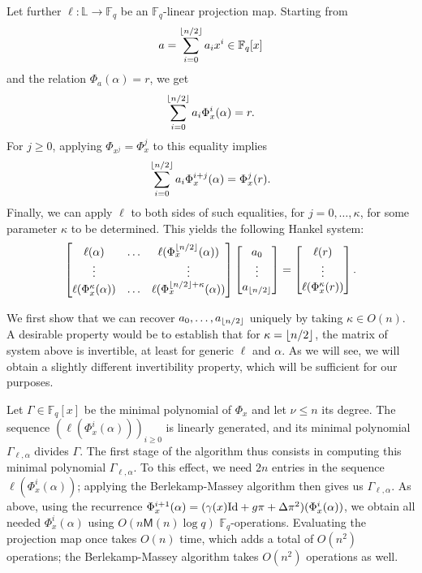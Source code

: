 \documentclass[sigconf]{acmart}
\newcommand{\M}{\mathsf{M}}
\newcommand{\F}{\mathbb{F}}
\renewcommand{\L}{\mathbb{L}}
\DeclarePairedDelimiter\floor{\lfloor}{\rfloor}
\begin{document}
Let further $\ell: \L \to \F_q$ be an $\F_q$-linear projection map.
Starting from 
\[a = \sum_{i = 0}^{\floor*{n/2}}a_ix^i \in \F_q[x]\]
and the relation $\Phi_a(\alpha)=r$,
we get
\[  \sum_{i = 0}^{\floor*{n/2}}a_i\Phi_x^i(\alpha)  = r.\]
For $j \geq 0$, applying $\Phi_{x^j}=\Phi_x^j$ to this equality implies
\[ \sum_{i = 0}^{\floor*{n/2}}a_i \Phi_x^{i+j}(\alpha) = \Phi_x^j(r).\]
Finally, we can apply $\ell$ to both sides of such equalities,
for $j=0,\dots,\kappa$, for some parameter $\kappa$ to be determined.
This yields the following Hankel system:
\[\begin{bmatrix}
   \ell(\alpha) & \ldots & \ell(\Phi_x^{\floor*{n/2}}(\alpha)) \\
    \vdots & & \vdots  \\ 
  \ell(\Phi_x^{\kappa}(\alpha)) &  \ldots & \ell(\Phi_x^{\floor*{n/2} + \kappa}(\alpha))
\end{bmatrix} 
\begin{bmatrix} a_0  \\ \vdots \\ a_{\floor*{n/2}} \end{bmatrix} 
= 
\begin{bmatrix} \ell(r) \\ \vdots \\   \ell(\Phi_x^{\kappa}(r)) \end{bmatrix}. \]

We first show that we can recover $a_0,\dots,a_{\floor*{n/2}}$
uniquely by taking $\kappa \in O(n)$. A desirable property would be to
establish that for $\kappa = \floor*{n/2}$, the matrix of system above
is invertible, at least for generic $\ell$ and $\alpha$. As we will
see, we will obtain a slightly different invertibility property, which
will be sufficient for our purposes.

Let $\Gamma \in \F_q[x]$ be the minimal polynomial of $\Phi_x$ and let
$\nu \le n$ its degree.  The sequence $(\ell(\Phi_x^i(\alpha)))_{i \ge
  0}$ is linearly generated, and its minimal polynomial
$\Gamma_{\ell,\alpha}$ divides $\Gamma$. The first stage of the
algorithm thus consists in computing this minimal polynomial
$\Gamma_{\ell,\alpha}$. To this effect, we need $2n$ entries in the
sequence $\ell(\Phi_x^i(\alpha))$; applying the Berlekamp-Massey
algorithm then gives us $\Gamma_{\ell,\alpha}$.  As above, using the
recurrence $\Phi_x^{i+1}(\alpha) = (\gamma(x) {\rm Id} + g\pi + \Delta
\pi^2)(\Phi_x^i(\alpha))$, we obtain all needed $\Phi_x^i(\alpha)$ using
$O(n\M(n)\log q)$ $\F_q$-operations. Evaluating the projection map
once takes $O(n)$ time, which adds a total of $O(n^2)$ operations; the
Berlekamp-Massey algorithm takes $O(n^2)$ operations as well.
\end{document}
